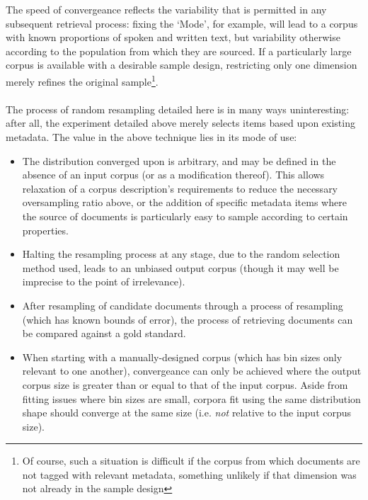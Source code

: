 The speed of convergeance reflects the variability that is permitted in any subsequent retrieval process: fixing the `Mode', for example, will lead to a corpus with known proportions of spoken and written text, but variability otherwise according to the population from which they are sourced.  If a particularly large corpus is available with a desirable sample design, restricting only one dimension merely refines the original sample\footnote{Of course, such a situation is difficult if the corpus from which documents are not tagged with relevant metadata, something unlikely if that dimension was not already in the sample design}.

\paragraph{}

The process of random resampling detailed here is in many ways uninteresting: after all, the experiment detailed above merely selects items based upon existing metadata.  The value in the above technique lies in its mode of use:

\begin{itemize}
    \item The distribution converged upon is arbitrary, and may be defined in the absence of an input corpus (or as a modification thereof).  This allows relaxation of a corpus description's requirements to reduce the necessary oversampling ratio above, or the addition of specific metadata items where the source of documents is particularly easy to sample according to certain properties.
    \item Halting the resampling process at any stage, due to the random selection method used, leads to an unbiased output corpus (though it may well be imprecise to the point of irrelevance).
    \item After resampling of candidate documents through a process of resampling (which has known bounds of error), the process of retrieving documents can be compared against a gold standard.
    \item When starting with a manually-designed corpus (which has bin sizes only relevant to one another), convergeance can only be achieved where the output corpus size is greater than or equal to that of the input corpus.  Aside from fitting issues where bin sizes are small, corpora fit using the same distribution shape should converge at the same size (i.e. \textsl{not} relative to the input corpus size).
\end{itemize}



